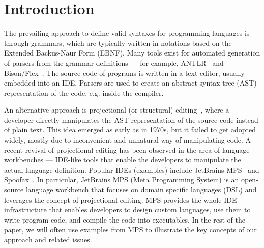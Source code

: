 \section{Introduction}

The prevailing approach to define valid syntaxes for programming languages is through grammars, which are typically written in notations based on the Extended Backus-Naur Form (EBNF).
Many tools exist for automated generation of parsers from the grammar definitions --- for example, ANTLR~\cite{ref:ANTLRBOOK,ref:ANTLR} and Bison/Flex~\cite{ref:BISONFLEX}.
The source code of programs is written in a text editor, usually embedded into an IDE. Parsers are used to create an abstract syntax tree (AST) representation of the code, e.g. inside the compiler.

An alternative approach is projectional (or structural) editing~\cite{ref:VWK15,ref:VSB14}, where a developer directly manipulates the AST representation of the source code instead of plain text.
This idea emerged as early as in 1970s, but it failed to get adopted widely, mostly due to inconvenient and unnatural way of manipulating code.
A recent revival of projectional editing has been observed in the area of language workbenches --- IDE-like tools that enable the developers to manipulate the actual language definition.
Popular IDEs (examples) include JetBrains MPS~\cite{ref:MPS,ref:MPSBOOK} and Spoofax~\cite{ref:KV10}.
In particular, JetBrains MPS (Meta Programming System) is an open-source language workbench that focuses on domain specific languages (DSL) and leverages the concept of projectional editing.
MPS provides the whole IDE infrastructure that enables developers to design custom languages, use them to write program code, and compile the code into executables.
In the rest of the paper, we will often use examples from MPS to illustrate the key concepts of our approach and related issues.


